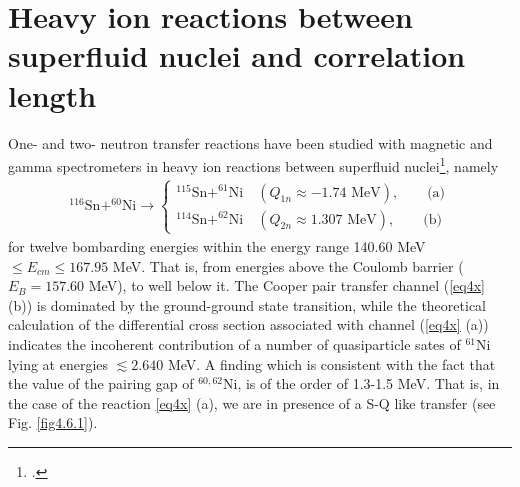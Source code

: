   \FloatBarrier
\section[Heavy ion reactions  and correlation length]{Heavy ion reactions between superfluid nuclei and correlation length}\label{S7.3}
One- and two- neutron transfer reactions  have been studied with magnetic and gamma spectrometers  in heavy ion reactions between superfluid nuclei\footnote{\cite{Montanari:14,Montanari:16}.}, namely
\begin{align}\label{eq4x}
^{116}\text{Sn}+^{60}\text{Ni}\to\left\{\begin{array}{c}
^{115}\text{Sn}+^{61}\text{Ni}\quad (Q_{1n}\approx -1.74\text{ MeV}),\quad\quad\text{(a)} \\ [10pt]
^{114}\text{Sn}+^{62}\text{Ni}\quad (Q_{2n}\approx 1.307\text{ MeV}),\quad\quad\text{(b)}
\end{array} \right.
\end{align}
for twelve bombarding energies within the energy range 140.60 MeV$\leq E_{cm}\leq167.95$ MeV. That is, from energies above the Coulomb barrier ($E_B=157.60$ MeV), to well below it. The Cooper pair transfer channel (\ref{eq4x} (b)) is dominated by the ground-ground state transition, while the theoretical calculation of the differential cross section associated with channel (\ref{eq4x} (a)) indicates the incoherent contribution of a number of quasiparticle sates of $^{61}$Ni lying at energies $\lesssim 2.640$ MeV. A finding  which is consistent with the fact that the value of the pairing gap of $^{60,62}$Ni, is of the order of 1.3-1.5 MeV. That is, in the case of the reaction \ref{eq4x} (a), we are in presence of a  S-Q like transfer (see Fig. \ref{fig4.6.1}).	
